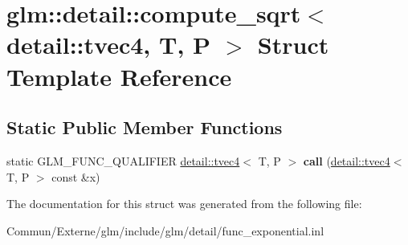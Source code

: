 \hypertarget{structglm_1_1detail_1_1compute__sqrt_3_01detail_1_1tvec4_00_01_t_00_01_p_01_4}{}\section{glm\+:\+:detail\+:\+:compute\+\_\+sqrt$<$ detail\+:\+:tvec4, T, P $>$ Struct Template Reference}
\label{structglm_1_1detail_1_1compute__sqrt_3_01detail_1_1tvec4_00_01_t_00_01_p_01_4}
\subsection*{Static Public Member Functions}
\begin{DoxyCompactItemize}
\item 
static G\+L\+M\+\_\+\+F\+U\+N\+C\+\_\+\+Q\+U\+A\+L\+I\+F\+I\+ER \hyperlink{structglm_1_1detail_1_1tvec4}{detail\+::tvec4}$<$ T, P $>$ {\bfseries call} (\hyperlink{structglm_1_1detail_1_1tvec4}{detail\+::tvec4}$<$ T, P $>$ const \&x)\hypertarget{structglm_1_1detail_1_1compute__sqrt_3_01detail_1_1tvec4_00_01_t_00_01_p_01_4_a75a6bf4911534e88541e66391ffb3f6e}{}\label{structglm_1_1detail_1_1compute__sqrt_3_01detail_1_1tvec4_00_01_t_00_01_p_01_4_a75a6bf4911534e88541e66391ffb3f6e}

\end{DoxyCompactItemize}


The documentation for this struct was generated from the following file\+:\begin{DoxyCompactItemize}
\item 
Commun/\+Externe/glm/include/glm/detail/func\+\_\+exponential.\+inl\end{DoxyCompactItemize}
